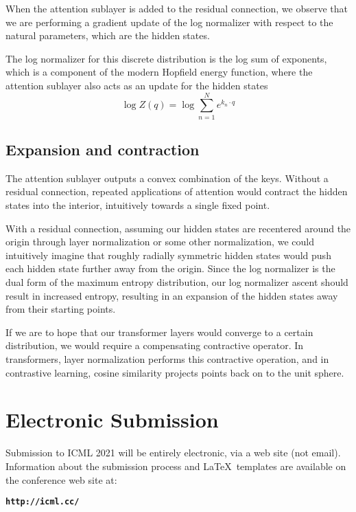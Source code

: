 \documentclass{article}
\begin{document}
When the attention sublayer is added to the residual connection, we observe that we are performing a gradient update of the log normalizer with respect to the natural parameters, which are the hidden states.

The log normalizer for this discrete distribution is the log sum of exponents, which is a component of the modern Hopfield energy function, where the attention sublayer also acts as an update for the hidden states
\begin{equation}
  \log Z(q) = \log \sum_{n=1}^N e^{ k_n \cdot q}
  \label{free energy}
\end{equation}

\subsection{Expansion and contraction}
\label{}

The attention sublayer outputs a convex combination of the keys. Without a residual connection, repeated applications of attention would contract the hidden states into the interior, intuitively towards a single fixed point.

With a residual connection, assuming our hidden states are recentered around the origin through layer normalization or some other normalization, we could intuitively imagine that roughly radially symmetric hidden states would push each hidden state further away from the origin.
Since the log normalizer is the dual form of the maximum entropy distribution, our log normalizer ascent should result in increased entropy, resulting in an expansion of the hidden states away from their starting points.

If we are to hope that our transformer layers would converge to a certain distribution, we would require a compensating contractive operator. In transformers, layer normalization performs this contractive operation, and in contrastive learning, cosine similarity projects points back on to the unit sphere.

\section{Electronic Submission}
\label{submission}

Submission to ICML 2021 will be entirely electronic, via a web site
(not email). Information about the submission process and \LaTeX\ templates
are available on the conference web site at:
\begin{center}
\textbf{\texttt{http://icml.cc/}}
\end{center}
\end{document}
